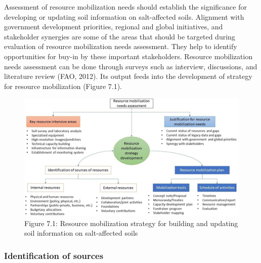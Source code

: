 \documentclass[
  10pt,
  b5paper,
]{book}
\begin{document}
Assessment of resource mobilization needs should establish the significance for developing or updating soil information on salt-affected soils. Alignment with government development priorities, regional and global initiatives, and stakeholder synergies are some of the areas that should be targeted during evaluation of resource mobilization needs assessment. They help to identify opportunities for buy-in by these important stakeholders.
Resource mobilization needs assessment can be done through surveys such as interview, discussions, and literature review (FAO, 2012). Its output feeds into the development of strategy for resource mobilization (Figure 7.1).

\begin{figure}
\centering
\includegraphics{figures/images/Figure7.1.png}
\caption{Figure 7.1: Resource mobilization strategy for building and updating soil information on salt-affected soils}
\end{figure}

\hypertarget{identification-of-sources}{%
\subsubsection{Identification of sources}\label{identification-of-sources}}
\end{document}
